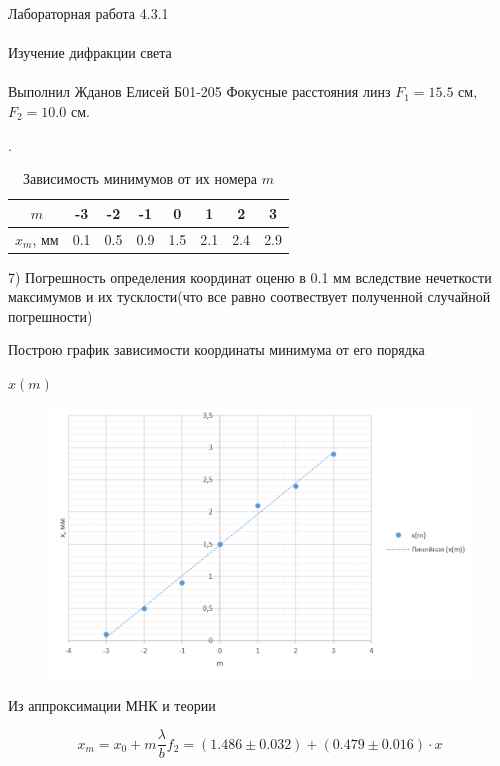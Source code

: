 \documentclass{astroedu-lab}
\begin{document}
\begin{problem}{\huge Лабораторная работа 4.3.1\\\\Изучение дифракции света\\\\Выполнил Жданов Елисей Б01-205}
Фокусные расстояния линз $F_1 = 15.5$ см, $F_2 = 10.0$ см.

.

\begin{table}[H]
	\caption{Зависимость минимумов от их номера $ m $}
	\begin{center}
		\begin{tabular}{|c|c|c|c|c|c|c|c|} \hline
			$m$ & -3 & -2 & -1 & 0 & 1 & 2 & 3\\ \hline
			$ x_m $, мм  & 0.1 & 0.5 & 0.9 & 1.5 & 2.1 & 2.4 & 2.9 \\ \hline
		\end{tabular}
	\end{center}
	\label{tab2}
\end{table}

7) Погрешность определения координат оценю в 0.1 мм вследствие нечеткости максимумов и их тусклости(что все равно соотвествует полученной случайной погрешности)

Построю график зависимости координаты минимума от его порядка

\newpage

\begin{center}
	\Large $x(m)$
\end{center}

\begin{figure}[!h]
	\centering
	\includegraphics[width=1\textwidth]{fraun_pl.png}
	\label{fig:boiler}
\end{figure}

Из аппроксимации МНК и теории

\begin{equation}
	x_m = x_0 + m \frac{\lambda}{b} f_2 = (1.486 \pm 0.032) + (0.479 \pm 0.016) \cdot x
\end{equation}


\end{problem}
\end{document}
